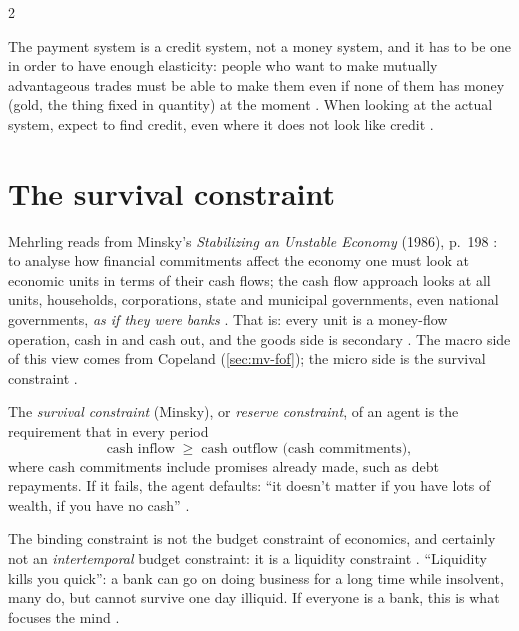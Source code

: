 \begin{paracol}{2}
\begin{proposition}\label{prop:mv-credit}
The payment system is a credit system, not a money system, and it has to be one in order to have enough elasticity: people who want to
make mutually advantageous trades must be able to make them even if none of them has money (gold, the thing fixed in quantity) at the
moment . When looking at the actual system, expect to find credit, even where it does not look like credit
.
\end{proposition}

\section{The survival constraint}\label{sec:mv-survival}

Mehrling reads from Minsky's \emph{Stabilizing an Unstable Economy} (1986), p.~198 : to analyse how financial commitments
affect the economy one must look at economic units in terms of their cash flows; the cash flow approach looks at all units, households,
corporations, state and municipal governments, even national governments, \emph{as if they were banks} . That is: every unit
is a money-flow operation, cash in and cash out, and the goods side is secondary . The macro side of this view comes from
Copeland (\cref{sec:mv-fof}); the micro side is the survival constraint .

\begin{definition}\label{def:mv-survival}
The \emph{survival constraint} (Minsky), or \emph{reserve constraint}, of an agent is the requirement that in every period
\[
  \text{cash inflow} \;\ge\; \text{cash outflow (cash commitments)} ,
\]
where cash commitments include promises already made, such as debt repayments. If it fails, the agent defaults: ``it doesn't matter if
you have lots of wealth, if you have no cash'' .
\end{definition}

The binding constraint is not the budget constraint of economics, and certainly not an \emph{intertemporal} budget constraint: it is a
liquidity constraint . ``Liquidity kills you quick'': a bank can go on doing business for a long time while
insolvent, many do, but cannot survive one day illiquid. If everyone is a bank, this is what focuses the mind .


\end{paracol}
